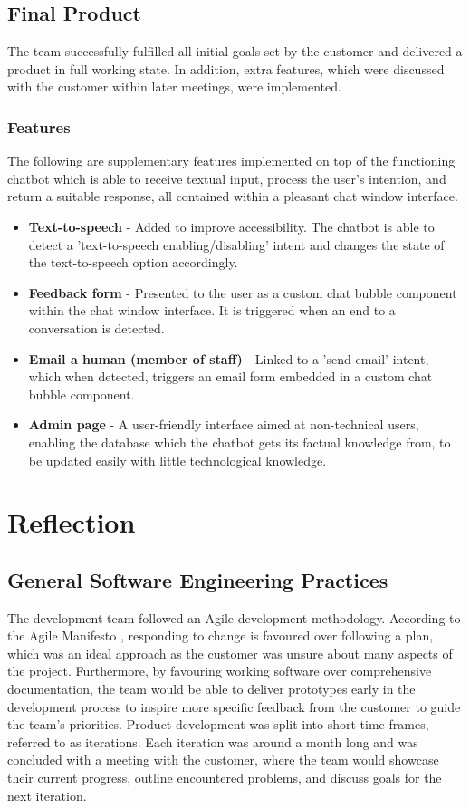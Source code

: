 \documentclass{l3proj}
\begin{document}
\subsection{Final Product}
\label{subsec:fprod}
The team successfully fulfilled all initial goals set by the customer and delivered a product in full working state. In addition, extra features, which were discussed with the customer within later meetings, were implemented.

\subsubsection{Features}
The following are supplementary features implemented on top of the functioning chatbot which is able to receive textual input, process the user's intention, and return a suitable response, all contained within a pleasant chat window interface.
\label{subsubsec:features}
\begin{itemize}
    \item \textbf{Text-to-speech} - Added to improve accessibility. The chatbot is able to detect a 'text-to-speech enabling/disabling' intent and changes the state of the text-to-speech option accordingly.
    \item \textbf{Feedback form} - Presented to the user as a custom chat bubble component within the chat window interface. It is triggered when an end to a conversation is detected.
    \item \textbf{Email a human (member of staff)} - Linked to a 'send email' intent, which when detected, triggers an email form embedded in a custom chat bubble component.
    \item \textbf{Admin page} - A user-friendly interface aimed at non-technical users, enabling the database which the chatbot gets its factual knowledge from, to be updated easily with little technological knowledge.
\end{itemize}


\section{Reflection}
\label{sec:reflection}
\subsection{General Software Engineering Practices}
\label{subsec:practices}
The development team followed an Agile development methodology. According to the Agile Manifesto \cite{AGILEMANIFESTO}, responding to change is favoured over following a plan, which was an ideal approach as the customer was unsure about many aspects of the project. Furthermore, by favouring working software over comprehensive documentation, the team would be able to deliver prototypes early in the development process to inspire more specific feedback from the customer to guide the team's priorities. Product development was split into short time frames, referred to as iterations. Each iteration was around a month long and was concluded with a meeting with the customer, where the team would showcase their current progress, outline encountered problems, and discuss goals for the next iteration.
\end{document}
